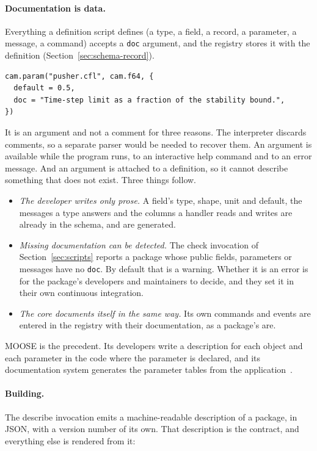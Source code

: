 \documentclass[11pt,a4paper]{article}
\newcommand{\code}[1]{\texttt{#1}}
\begin{document}
\paragraph{Documentation is data.}  Everything a definition script defines
(a type, a field, a record, a parameter, a message, a command) accepts a
\code{doc} argument, and the registry stores it with the definition
(Section~\ref{sec:schema-record}).

\begin{lstlisting}[language={[5.3]Lua}]
cam.param("pusher.cfl", cam.f64, {
  default = 0.5,
  doc = "Time-step limit as a fraction of the stability bound.",
})
\end{lstlisting}

It is an argument and not a comment for three reasons.  The interpreter
discards comments, so a separate parser would be needed to recover them.
An argument is available while the program runs, to an interactive help
command and to an error message.  And an argument is attached to a
definition, so it cannot describe something that does not exist.  Three
things follow.

\begin{itemize}
  \item \emph{The developer writes only prose.}  A field's type, shape, unit
        and default, the messages a type answers and the columns a handler
        reads and writes are already in the schema, and are generated.
  \item \emph{Missing documentation can be detected.}  The check invocation
        of Section~\ref{sec:scripts} reports a package whose public fields,
        parameters or messages have no \code{doc}.  By default that is a
        warning.  Whether it is an error is for the package's developers and
        maintainers to decide, and they set it in their own continuous
        integration.
  \item \emph{The core documents itself in the same way.}  Its own commands
        and events are entered in the registry with their documentation,
        as a package's are.
\end{itemize}

MOOSE is the precedent.  Its developers write a description for each object
and each parameter in the code where the parameter is declared, and its
documentation system generates the parameter tables from the
application~\cite{moosedocs}.

\paragraph{Building.}  The describe invocation emits a machine-readable
description of a package, in JSON, with a version number of its own.  That
description is the contract, and everything else is rendered from it:
\end{document}
